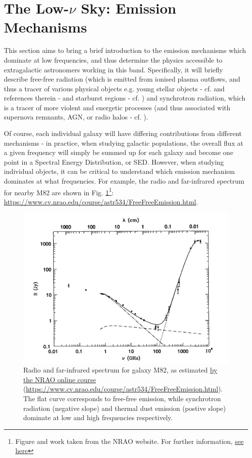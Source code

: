 
\section{The Low-$\nu$ Sky: Emission Mechanisms}
\pg
This section aims to bring a brief introduction to the emission mechanisms which dominate at low frequencies, and thus determine the physics accessible to extragalactic astronomers working in this band. Specifically, it will briefly describe
free-free radiation (which is emitted from ionised plasma outflows, and thus a tracer of various physical objects e.g. young stellar objects - cf. \citet{2017ApJ...834..206C} and references therein - and starburst regions - cf. \citet{2015A&A...574A.114V}) and synchrotron radiation, which is a tracer of more violent and energetic processes (and thus associated with supernova remnants, AGN, or radio halos - cf. \citet{2010A&A...509A..68C}).

\pg
Of course, each individual galaxy will have differing contributions from different mechanisms - in practice, when studying galactic populations, the overall flux at a given frequency will simply be summed up for each galaxy and become one point in a Spectral Energy Distribution, or SED. However, when studying individual objects, it can be critical to understand which emission mechanism dominates at what frequencies. For example, the radio and far-infrared spectrum for nearby M82 are shown in Fig. \ref{plot.m82.spectrum}\footnote{Figure and work taken from the NRAO website. For further information, \href{https://www.cv.nrao.edu/course/astr534/FreeFreeEmission.html}{see here}}: \url{https://www.cv.nrao.edu/course/astr534/FreeFreeEmission.html}.
\begin{figure}[!h]
\centering
\includegraphics[width=\textwidth]{images/M82Spectrum.png}
\caption{\label{plot.m82.spectrum} Radio and far-infrared spectrum for galaxy M82, as estimated \href{https://www.cv.nrao.edu/course/astr534/FreeFreeEmission.html}{by the NRAO online course} (\url{https://www.cv.nrao.edu/course/astr534/FreeFreeEmission.html}). The flat curve corresponds to free-free emission, while synchrotron radiation (negative slope) and thermal dust emission (postive slope) dominate at low and high frequencies respectively.}
\end{figure}


